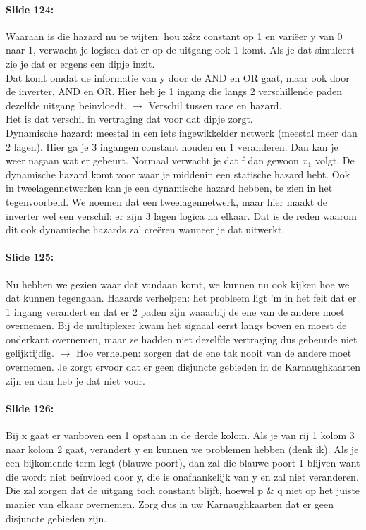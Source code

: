 \documentclass[10pt,a4paper]{book}
\begin{document}
\paragraph{Slide 124:} Waaraan is die hazard nu te wijten: hou x\&z constant op 1 en vari\"eer y van 0 naar 1, verwacht je logisch dat er op de uitgang ook 1 komt. Als je dat simuleert zie je dat er ergens een dipje inzit.\\
Dat komt omdat de informatie van y door de AND en OR gaat, maar ook door de inverter, AND en OR. Hier heb je 1 ingang die langs 2 verschillende paden dezelfde uitgang beinvloedt. $\rightarrow$ Verschil tussen race en hazard.\\
Het is dat verschil in vertraging dat voor dat dipje zorgt.\\
Dynamische hazard: meestal in een iets ingewikkelder netwerk (meestal meer dan 2 lagen). Hier ga je 3 ingangen constant houden en 1 veranderen. Dan kan je weer nagaan wat er gebeurt. Normaal verwacht je dat f dan gewoon $x_1$ volgt. De dynamische hazard komt voor waar je middenin een statische hazard hebt. Ook in tweelagennetwerken kan je een dynamische hazard hebben, te zien in het tegenvoorbeld. We noemen dat een tweelagennetwerk, maar hier maakt de inverter wel een verschil: er zijn 3 lagen logica na elkaar. Dat is de reden waarom dit ook dynamische hazards zal cre\"eren wanneer je dat uitwerkt.

\paragraph{Slide 125:} Nu hebben we gezien waar dat vandaan komt, we kunnen nu ook kijken hoe we dat kunnen tegengaan. Hazards verhelpen: het probleem ligt 'm in het feit dat er 1 ingang verandert en dat er 2 paden zijn waaarbij de ene van de andere moet overnemen. Bij de multiplexer kwam het signaal eerst langs boven en moest de onderkant overnemen, maar ze hadden niet dezelfde vertraging dus gebeurde niet gelijktijdig. $\rightarrow$ Hoe verhelpen: zorgen dat de ene tak nooit van de andere moet overnemen. Je zorgt ervoor dat er geen disjuncte gebieden in de Karnaughkaarten zijn en dan heb je dat niet voor.

\paragraph{Slide 126:} Bij x gaat er vanboven een 1 opstaan in de derde kolom. Als je van rij 1 kolom 3 naar kolom 2 gaat, verandert y en kunnen we problemen hebben (denk ik). Als je een bijkomende term legt (blauwe poort), dan zal die blauwe poort 1 blijven want die wordt niet be\"invloed door y, die is onafhankelijk van y en zal niet veranderen. Die zal zorgen dat de uitgang toch constant blijft, hoewel p \& q niet op het juiste manier van elkaar overnemen. Zorg dus in uw Karnaughkaarten dat er geen disjuncte gebieden zijn.
\end{document}
